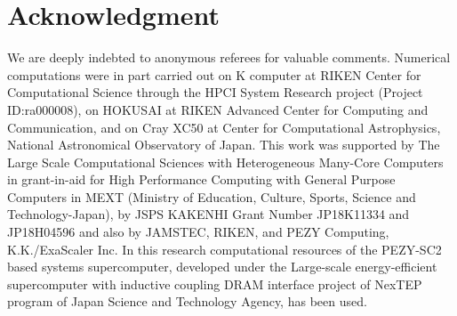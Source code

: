 \documentclass[Afour,sageh,times]{sagej}
\begin{document}
\section*{Acknowledgment}

We are deeply indebted to anonymous referees for valuable comments.
Numerical computations were in part carried out on K computer at RIKEN
Center for Computational Science through the HPCI System Research
project (Project ID:ra000008), on HOKUSAI at RIKEN Advanced Center for
Computing and Communication, and on Cray XC50 at Center for
Computational Astrophysics, National Astronomical Observatory of
Japan. This work was supported by The Large Scale Computational
Sciences with Heterogeneous Many-Core Computers in grant-in-aid for
High Performance Computing with General Purpose Computers in MEXT
(Ministry of Education, Culture, Sports, Science and
Technology-Japan), by JSPS KAKENHI Grant Number JP18K11334 and
JP18H04596 and also by JAMSTEC, RIKEN, and PEZY Computing,
K.K./ExaScaler Inc. In this research computational resources of the
PEZY-SC2 based systems supercomputer, developed under the Large-scale
energy-efficient supercomputer with inductive coupling DRAM interface
project of NexTEP program of Japan Science and Technology Agency, has
been used.



%

\end{document}
